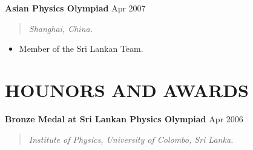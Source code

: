 \documentclass[mm]{res} %
\begin{document}
\begin{resume}
\textbf{Asian Physics Olympiad} \hfill Apr 2007
\begin{quote}
\emph{Shanghai, China.}
\end{quote}

\begin{itemize} \itemsep -1pt %
\item Member of the Sri Lankan Team.
\end{itemize}









\section{HOUNORS AND AWARDS}

\textbf{Bronze Medal at Sri Lankan Physics Olympiad} \hfill Apr 2006
\begin{quote}
\emph{Institute of Physics, University of Colombo, Sri Lanka.}
\end{quote}


\end{resume}
\end{document}
